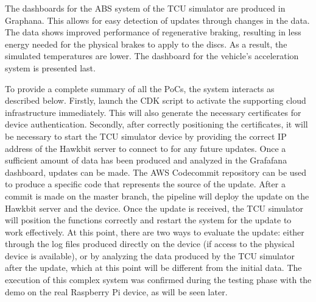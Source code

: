The dashboards for the ABS system of the TCU simulator are produced in Graphana. This allows for easy detection of updates through changes in the data. The data shows improved performance of regenerative braking, resulting in less energy needed for the physical brakes to apply to the discs. As a result, the simulated temperatures are lower. The dashboard for the vehicle's acceleration system is presented last.

To provide a complete summary of all the PoCs, the system interacts as described below. Firstly, launch the CDK script to activate the supporting cloud infrastructure immediately. This will also generate the necessary certificates for device authentication. Secondly, after correctly positioning the certificates, it will be necessary to start the TCU simulator device by providing the correct IP address of the Hawkbit server to connect to for any future updates. Once a sufficient amount of data has been produced and analyzed in the Grafafana dashboard, updates can be made. The AWS Codecommit repository can be used to produce a specific code that represents the source of the update. After a commit is made on the master branch, the pipeline will deploy the update on the Hawkbit server and the device. Once the update is received, the TCU simulator will position the functions correctly and restart the system for the update to work effectively. At this point, there are two ways to evaluate the update: either through the log files produced directly on the device (if access to the physical device is available), or by analyzing the data produced by the TCU simulator after the update, which at this point will be different from the initial data. The execution of this complex system was confirmed during the testing phase with the demo on the real Raspberry Pi device, as will be seen later.
